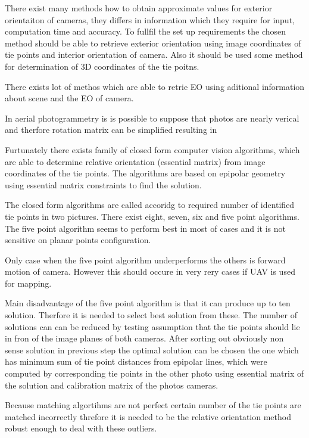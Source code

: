 \documentclass[a4paper,12pt]{report}
\begin{document}
There exist many methods how to obtain approximate values for exterior orientaiton of cameras, they 
differs in information which they require for input, computation time and accuracy. 
To fullfil the set up requirements the chosen method should be able to retrieve exterior orientation 
using image coordinates of tie points and interior orientation of camera.
Also it should be used some method for determination of 3D coordinates of the tie poitns.

There exists lot of methos which are able to retrie EO using aditional 
information about scene and the EO of camera.

In aerial photogrammetry is is possible to suppose that photos are nearly verical and therfore 
rotation matrix can be simplified resulting in 

Furtunately there exists family of closed form computer vision algorithms,
which are able to determine relative orientation (essential matrix) from image coordinates 
of the tie points. The algorithms are based on epipolar geometry using essential matrix 
constraints to find the solution. 

The closed form algorithms are called accoridg to required number of identified tie points in two pictures.
There exist eight, seven, six and five point algorithms. The five point algorithm seems to perform best in most
of cases \cite{stewenius2006recent} and it is not sensitive on planar points configuration.

Only case when the five point algorithm \cite{nister2004efficient} underperforms 
\cite{bruckner2008experimental} the others is forward motion of camera.
However this should occure in very rery cases  if UAV is used for mapping.

Main disadvantage of the five point algorithm is that it can produce up to ten solution.
Therfore it is needed to select best solution from these. The number of solutions can
can be reduced by testing assumption that the tie points should lie in fron of the image 
planes of both cameras. After sorting out obviously non sense solution in previous step
 the optimal solution can be chosen the one which has minimum sum of tie point distances
 from epipolar lines, which were computed by corresponding tie points in the other photo
 using essential matrix of the solution and calibration matrix of the photos cameras.  

Because matching algortihms are not perfect  certain number of the tie points are matched 
incorrectly threfore it is needed to be the relative orientation method robust enough to
deal with these outliers.
\end{document}

